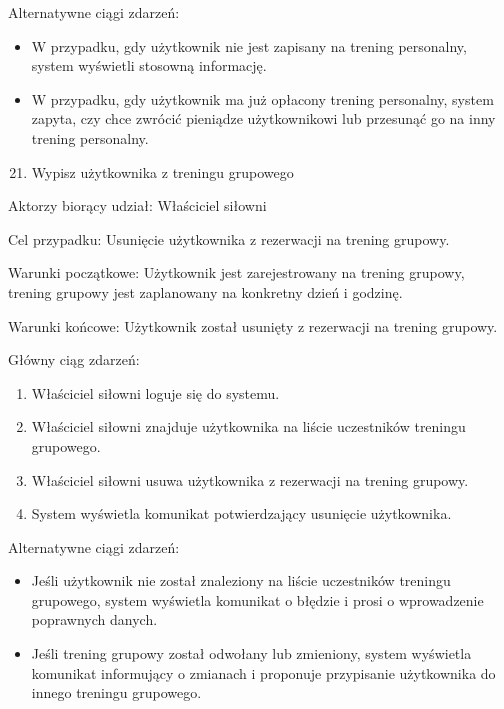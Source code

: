 \documentclass[
]{article}
\providecommand{\tightlist}{%
  \setlength{\itemsep}{0pt}\setlength{\parskip}{0pt}}
\begin{document}
{Alternatywne ciągi zdarzeń:}

\begin{itemize}
\tightlist
\item
  {W przypadku, gdy użytkownik nie jest zapisany na trening personalny,
  system wyświetli stosowną informację.}
\item
  {W przypadku, gdy użytkownik ma już opłacony trening personalny,
  system zapyta, czy chce zwrócić pieniądze użytkownikowi lub przesunąć
  go na inny trening personalny.}
\end{itemize}

{}

{}

\begin{enumerate}
\setcounter{enumi}{20}
\tightlist
\item
  {Wypisz użytkownika z treningu grupowego}
\end{enumerate}

{Aktorzy biorący udział: Właściciel siłowni}

{Cel przypadku: Usunięcie użytkownika z rezerwacji na trening grupowy.}

{Warunki początkowe: Użytkownik jest zarejestrowany na trening grupowy,
trening grupowy jest zaplanowany na konkretny dzień i godzinę.}

{Warunki końcowe: Użytkownik został usunięty z rezerwacji na trening
grupowy.}

{Główny ciąg zdarzeń:}

\begin{enumerate}
\tightlist
\item
  {Właściciel siłowni loguje się do systemu.}
\item
  {Właściciel siłowni znajduje użytkownika na liście uczestników
  treningu grupowego.}
\item
  {Właściciel siłowni usuwa użytkownika z rezerwacji na trening
  grupowy.}
\item
  {System wyświetla komunikat potwierdzający usunięcie użytkownika.}
\end{enumerate}

{Alternatywne ciągi zdarzeń:}

\begin{itemize}
\tightlist
\item
  {Jeśli użytkownik nie został znaleziony na liście uczestników treningu
  grupowego, system wyświetla komunikat o błędzie i prosi o wprowadzenie
  poprawnych danych.}
\item
  {Jeśli trening grupowy został odwołany lub zmieniony, system wyświetla
  komunikat informujący o zmianach i proponuje przypisanie użytkownika
  do innego treningu grupowego.}
\end{itemize}
\end{document}
